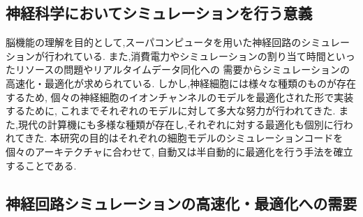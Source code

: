 \subsection{神経科学においてシミュレーションを行う意義}
脳機能の理解を目的として,スーパコンピュータを用いた神経回路のシミュレーションが行われている.
また,消費電力やシミュレーションの割り当て時間といったリソースの問題やリアルタイムデータ同化への
需要からシミュレーションの高速化・最適化が求められている.
しかし,神経細胞には様々な種類のものが存在するため,
個々の神経細胞のイオンチャンネルのモデルを最適化された形で実装するために,
これまでそれぞれのモデルに対して多大な努力が行われてきた.
また,現代の計算機にも多様な種類が存在し,それぞれに対する最適化も個別に行われてきた.
本研究の目的はそれぞれの細胞モデルのシミュレーションコードを個々のアーキテクチャに合わせて,
自動又は半自動的に最適化を行う手法を確立することである.

\subsection{神経回路シミュレーションの高速化・最適化への需要}
